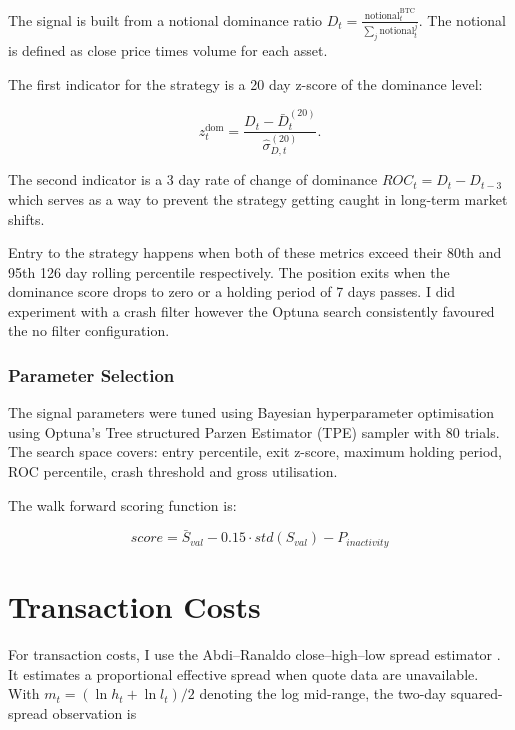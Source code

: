 \documentclass[10pt,a4paper]{article}
\begin{document}
The signal is built from a notional dominance ratio $D_t = \frac{\mathrm{notional}^{\mathrm{BTC}}_t}{\sum_j \mathrm{notional}^{j}_t}$. The notional is defined as close price times volume for each asset.

The first indicator for the strategy is a 20 day z-score of the dominance level:

\begin{equation}
    z_t^{\mathrm{dom}} = \frac{D_t - \bar{D}_t^{(20)}}{\hat{\sigma}_{D,t}^{(20)}}.
\end{equation}

The second indicator is a 3 day rate of change of dominance $ROC_t=D_t-D_{t-3}$ which serves as a way to prevent the strategy getting caught in long-term market shifts.

Entry to the strategy happens when both of these metrics exceed their 80th and 95th 126 day rolling percentile respectively. The position exits when the dominance score drops to zero or a holding period of 7 days passes. I did experiment with a crash filter however the Optuna search consistently favoured the no filter configuration.

\subsubsection{Parameter Selection}

The signal parameters were tuned using Bayesian hyperparameter optimisation using Optuna's Tree structured Parzen Estimator (TPE) sampler with 80 trials. The search space covers: entry percentile, exit z-score, maximum holding period, ROC percentile, crash threshold and gross utilisation.

The walk forward scoring function is:

\begin{equation}
  score = \bar{S}_{val} - 0.15\cdot std(S_{val})-P_{inactivity}
\end{equation}




\section{Transaction Costs}

For transaction costs, I use the Abdi--Ranaldo close--high--low spread estimator \citep{AbdiRanaldo2017}. It estimates a proportional effective spread when quote data are unavailable. With $m_t=(\ln h_t+\ln l_t)/2$ denoting the log mid-range, the two-day squared-spread observation is
\end{document}
